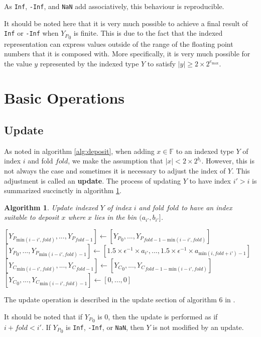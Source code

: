 \documentclass[12pt]{article}
\providecommand{\F}{\ensuremath{\mathbb{F}}}
\providecommand{\min}{\ensuremath{\text{min}}}
\providecommand{\max}{\ensuremath{\text{max}}}
\theoremstyle{plain}
\newtheorem{alg}{Algorithm}[section]
\begin{document}
      As \verb|Inf|, \verb|-Inf|, and \verb|NaN| add associatively, this behaviour is reproducible.

      It should be noted here that it is very much possible to achieve a final result of \verb|Inf| or \verb|-Inf| when ${Y_P}_0$ is finite. This is due to the fact that the indexed representation can express values outside of the range of the floating point numbers that it is composed with. More specifically, it is very much possible for the value $y$ represented by the indexed type $Y$ to satisfy $|y| \geq 2 \times 2^{e_{\max}}$.

\section{Basic Operations}
  \subsection{Update}
    As noted in algorithm \ref{alg:deposit}, when adding $x \in \F$ to an indexed type $Y$ of index $i$ and fold $fold$, we make the assumption that $|x| < 2 \times 2^{b_i}$. However, this is not always the case and sometimes it is necessary to adjust the index of $Y$. This adjustment is called an \textbf{update}. The process of updating $Y$ to have index $i' > i$ is summarized succinctly in algorithm \ref{alg:update}.
    \begin{alg}
      Update indexed $Y$ of index $i$ and fold $fold$ to have an index suitable to deposit $x$ where $x$ lies in the bin $(a_{i'}, b_{i'}]$.
      \begin{algorithmic}
            \State $[{Y_P}_{\min(i - i', fold)}, ..., {Y_P}_{fold - 1}] \gets [{Y_P}_0, ..., {Y_P}_{fold - 1 - \min(i - i', fold)}]$
            \State $[{Y_P}_0, ..., {Y_P}_{\min(i - i', fold) - 1}] \gets [1.5 \times \epsilon^{-1} \times a_{i'}, ..., 1.5 \times \epsilon^{-1} \times a_{\min(i, fold + i') - 1}]$
            \State $[{Y_C}_{\min(i - i', fold)}, ..., {Y_C}_{fold - 1}] \gets [{Y_C}_0, ..., {Y_C}_{fold - 1 - \min(i - i', fold)}]$
            \State $[{Y_C}_0, ..., {Y_C}_{\min(i - i', fold) - 1}] \gets [0, ..., 0]$
          \EndIf
        \EndFunction
      \end{algorithmic}
      \label{alg:update}
    \end{alg}
    The update operation is described in the update section of algorithm $6$ in \cite{repsum}.

    It should be noted that if ${Y_P}_0$ is 0, then the update is performed as if $i + fold < i'$. If ${Y_P}_0$ is \verb|Inf|, \verb|-Inf|, or \verb|NaN|, then $Y$ is not modified by an update.
\end{document}

